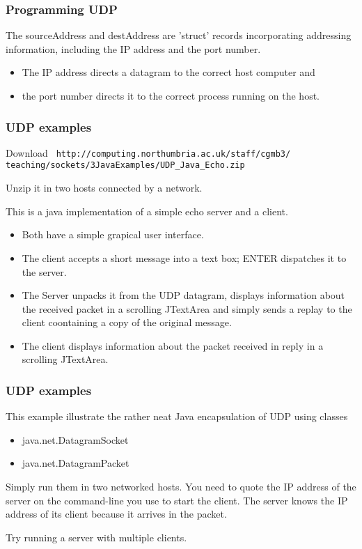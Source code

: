 \documentclass[10pt, hyperref={pdfpagelabels=false}]{beamer}
\begin{document}
\begin{frame}
\frametitle{Programming UDP}

The sourceAddress and destAddress are 'struct' records incorporating addressing information, including the IP address and the port number. 

\begin{itemize}
\item The IP address directs a datagram to the correct host computer and
\item the port number directs it to the correct process running on the host.
\end{itemize}
\end{frame}

\begin{frame}
\frametitle{UDP examples}
Download \texttt{\color{blue} \small http://computing.northumbria.ac.uk/staff/cgmb3/\\teaching/sockets/3JavaExamples/UDP\_Java\_Echo.zip}

Unzip it in two hosts connected by a network.

This is a java implementation of a simple echo server and a client.
\begin{itemize}
\item Both have a simple grapical user interface.
\item The client accepts a short message into a text box; ENTER dispatches it to the server.
\item The Server unpacks it from the UDP datagram, displays information about the received packet in a scrolling JTextArea and simply sends a replay to the client coontaining a copy of the original message.
\item The client displays information about the packet received in reply in a scrolling JTextArea.
\end{itemize}
\end{frame}

\begin{frame}
\frametitle{UDP examples}
This example illustrate the rather neat Java encapsulation of UDP using classes
\begin{itemize}
\item java.net.DatagramSocket
\item java.net.DatagramPacket
\end{itemize}

Simply run them in two networked hosts. You need to quote the IP address of the server on the command-line you use to start the client. The server knows the IP address of its client because it arrives in the packet.

Try running a server with multiple clients. 
\end{frame}
\end{document}
